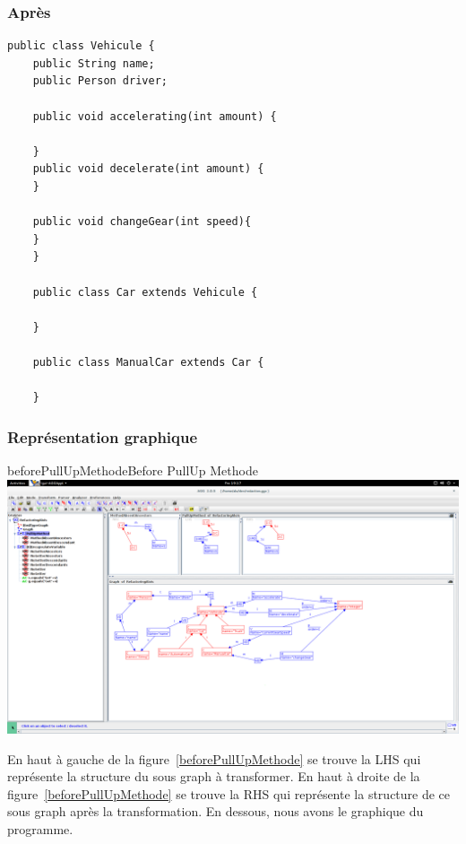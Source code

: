 \documentclass[a4paper, 12pt]{article}
\begin{document}
  \subsubsection{Après}
  \begin{lstlisting}[frame=single]
    public class Vehicule {
    public String name;
    public Person driver;

    public void accelerating(int amount) {

    }
    public void decelerate(int amount) {
    }

    public void changeGear(int speed){
    }
    }

    public class Car extends Vehicule {

    }

    public class ManualCar extends Car {

    }
  \end{lstlisting}

  \subsubsection{Représentation graphique}

  \begin{myfig}{beforePullUpMethode}{Before PullUp Methode}
    \includegraphics[width=\textwidth]{beforePullUpMethode.png}
  \end{myfig}

  En haut à gauche de la figure~\ref{beforePullUpMethode} se trouve la LHS qui représente la structure du sous graph à transformer.
  En haut à droite de la figure~\ref{beforePullUpMethode} se trouve la RHS qui représente la structure de ce sous graph après la transformation.
  En dessous, nous avons le graphique du programme.
\end{document}
